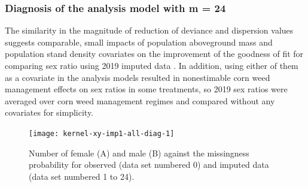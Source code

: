 \documentclass[
]{article}
\begin{document}
\hypertarget{diagnosis-of-the-analysis-model-with-m-24}{%
\subsubsection*{Diagnosis of the analysis model with m = 24}\label{diagnosis-of-the-analysis-model-with-m-24}}

The similarity in the magnitude of reduction of deviance and dispersion values suggests comparable, small impacts of population aboveground mass and population stand density covariates on the improvement of the goodness of fit for comparing sex ratio using 2019 imputed data \citep{nguyenDataImpactCropping2022}. In addition, using either of them as a covariate in the analysis models resulted in nonestimable corn weed management effects on sex ratios in some treatments, so 2019 sex ratios were averaged over corn weed management regimes and compared without any covariates for simplicity.

\begin{figure}[H]
\texttt{[image: kernel-xy-imp1-all-diag-1]} \caption{Number of female (A) and male (B) against the missingness probability for observed (data set numbered 0) and imputed data (data set numbered 1 to 24).}\label{fig:kernel-xy-imp1-all-diag}
\end{figure}
\end{document}
